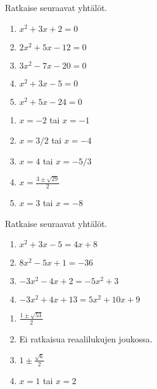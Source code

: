 \begin{tehtava}
    Ratkaise seuraavat yhtälöt.
    \begin{enumerate}
        \item $x^2+3x+2=0$
        \item $2x^2+5x-12=0$
        \item $3x^2-7x-20=0$
        \item $x^2+3x-5=0$
        \item $x^2+5x-24=0$
    \end{enumerate}
    \begin{vastaus}
        \begin{enumerate}
            \item $x=-2$ tai $x=-1$
            \item $x=3/2$ tai $x=-4$
            \item $x=4$ tai $x=-5/3$
            \item $x=\frac{3\pm\sqrt{29}}{2}$
            \item $x=3$ tai $x=-8$
        \end{enumerate}
    \end{vastaus}
\end{tehtava}

\begin{tehtava}
    Ratkaise seuraavat yhtälöt.
    \begin{enumerate}
        \item $x^2+3x-5=4x+8$
        \item $8x^2-5x+1=-36$
        \item $-3x^2-4x+2=-5x^2+3$
        \item $-3x^2+4x+13=5x^2+10x+9$
    \end{enumerate}
    \begin{vastaus}
        \begin{enumerate}
            \item $\frac{1\pm\sqrt{53}}{2}$
            \item Ei ratkaisua reaalilukujen joukossa.
            \item $1\pm\frac{\sqrt{6}}{2}$
            \item $x=1$ tai $x=2$
        \end{enumerate}
    \end{vastaus}
\end{tehtava}
